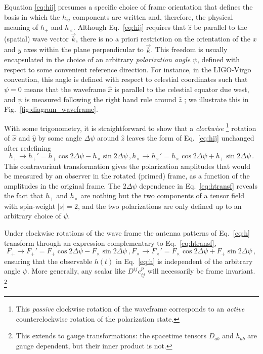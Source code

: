 \documentclass[aps,prd,twocolumn,superscriptaddress,preprintnumbers,floatfix,nofootinbib]{revtex4-2}
\newcommand{\beq}{\begin{equation}}
\newcommand{\eeq}{\end{equation}}
\newcommand*{\eq}[1]{Eq.~\eqref{eq:#1}}
\begin{document}
Equation \eqref{eq:hij} presumes a specific choice of frame orientation that defines the basis in which the $h_{ij}$ components are written and, therefore, the physical meaning of $h_{+}$ and $h_\times$.
Although \eq{hij} requires that $\hat{z}$ be parallel to the (spatial) wave vector $\vec{k}$, there is no a priori restriction on the orientation of the $x$ and $y$ axes within the plane perpendicular to $\vec{k}$.
This freedom is usually encapsulated in the choice of an arbitrary \emph{polarization angle} $\psi$, defined with respect to some convenient reference direction.
For instance, in the LIGO-Virgo convention, this angle is defined with respect to celestial coordinates such that $\psi=0$ means that the waveframe $\hat{x}$ is parallel to the celestial equator due west, and $\psi$ is measured following the right hand rule around $\hat{z}$ \cite{LALSuite:wave,Anderson:T010110}; we illustrate this in Fig.~\ref{fig:diagram_waveframe}.

With some trigonometry, it is straightforward to show that a \emph{clockwise}%
\footnote{This \emph{passive} clockwise rotation of the waveframe corresponds to an \emph{active} counterclockwise rotation of the polarization state.}
rotation of $\hat{x}$ and $\hat{y}$ by some angle $\Delta \psi$ around $\hat{z}$ leaves the form of \eq{hij} unchanged after redefining
\begin{subequations} \label{eq:htransf}
\beq
h_+ \rightarrow h_+' = h_+ \cos 2\Delta \psi - h_\times \sin 2\Delta\psi \, ,
\eeq
\beq
h_\times \rightarrow h_\times' = h_\times \cos 2\Delta \psi + h_+ \sin 2\Delta\psi \, .
\eeq
\end{subequations}
This contravariant transformation gives the polarization amplitudes that would be measured by an observer in the rotated (primed) frame, as a function of the amplitudes in the original frame.
The $2\Delta\psi$ dependence in \eq{htransf} reveals the fact that $h_+$ and $h_\times$ are nothing but the two components of a tensor field with spin-weight $|s|=2$, and the two polarizations are only defined up to an arbitrary choice of $\psi$.

Under clockwise rotations of the wave frame the antenna patterns of \eq{h} transform through an expression complementary to \eq{htransf},
\begin{subequations} \label{eq:Ftransf}
\beq
F_+ \rightarrow F_+' = F_+ \cos 2\Delta \psi - F_\times \sin 2\Delta\psi \, ,
\eeq
\beq
F_\times \rightarrow F_\times' = F_\times \cos 2\Delta \psi + F_+ \sin 2\Delta\psi \, ,
\eeq
\end{subequations}
ensuring that the observable $h(t)$ in \eq{h} is independent of the arbitrary angle $\psi$.
More generally, any scalar like $D^{ij} e^{p}_{ij}$ will necessarily be frame invariant.%
\footnote{This extends to gauge transformations: the spacetime tensors $D_{ab}$ and $h_{ab}$ are gauge dependent, but their inner product is not.}
\end{document}
